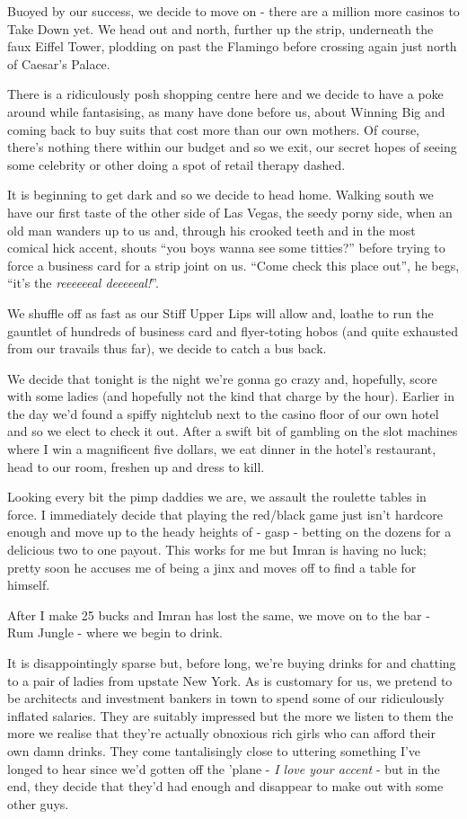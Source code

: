 \documentclass[a5paper,titlepage,11pt]{book}
\begin{document}
Buoyed by our success, we decide to move on - there are a million more casinos to Take Down yet.  We head out and north, further up the strip, underneath the faux Eiffel Tower, plodding on past the Flamingo before crossing again just north of Caesar's Palace.

There is a ridiculously posh shopping centre here and we decide to have a poke around while fantasising, as many have done before us, about Winning Big and coming back to buy suits that cost more than our own mothers.  Of course, there's nothing there within our budget and so we exit, our secret hopes of seeing some celebrity or other doing a spot of retail therapy dashed.

It is beginning to get dark and so we decide to head home.  Walking south we have our first taste of the other side of Las Vegas, the seedy porny side, when an old man wanders up to us and, through his crooked teeth and in the most comical hick accent, shouts ``you boys wanna see some titties?'' before trying to force a business card for a strip joint on us. ``Come check this place out'', he begs, ``it's the \emph{reeeeeeal deeeeeal!}''. 

We shuffle off as fast as our Stiff Upper Lips will allow and, loathe to run the gauntlet of hundreds of business card and flyer-toting hobos (and quite exhausted from our travails thus far), we decide to catch a bus back.

We decide that tonight is the night we're gonna go crazy and, hopefully, score with some ladies (and hopefully not the kind that charge by the hour).  Earlier in the day we'd found a spiffy nightclub next to the casino floor of our own hotel and so we elect to check it out.  After a swift bit of gambling on the slot machines where I win a magnificent five dollars, we eat dinner in the hotel's restaurant, head to our room, freshen up and dress to kill.

Looking every bit the pimp daddies we are, we assault the roulette tables in force.  I immediately decide that playing the red/black game just isn't hardcore enough and move up to the heady heights of - gasp - betting on the dozens for a delicious two to one payout.  This works for me but Imran is having no luck; pretty soon he accuses me of being a jinx and moves off to find a table for himself.

After I make 25 bucks and Imran has lost the same, we move on to the bar - Rum Jungle - where we begin to drink.

It is disappointingly sparse but, before long, we're buying drinks for and chatting to a pair of ladies from upstate New York.  As is customary for us, we pretend to be architects and investment bankers in town to spend some of our ridiculously inflated salaries.  They are suitably impressed but the more we listen to them the more we realise that they're actually obnoxious rich girls who can afford their own damn drinks.  They come tantalisingly close to uttering something I've longed to hear since we'd gotten off the 'plane - \emph{I love your accent} - but in the end, they decide that they'd had enough and disappear to make out with some other guys.
\end{document}
